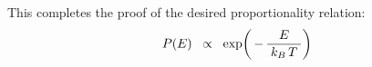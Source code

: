 \vskip 0.4cm
\noindent
This completes the proof of the desired proportionality relation:
\begin{equation*}
P(E)
\;\; \propto \;\;
    \exp\!\left(\,
        -\,\dfrac{E}{
            {\color{white}.}
            k_{B}\,T
            {\color{white}.}
            }
        \right)
\end{equation*}




